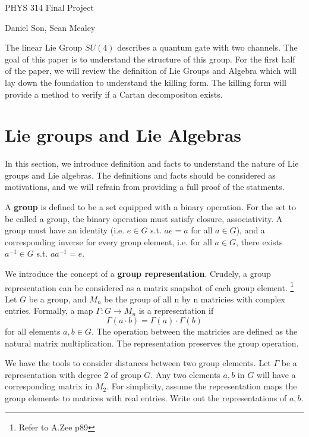 \documentclass{article}
\begin{document}
\begin{center}
\LARGE
PHYS 314 Final Project

\Large
Daniel Son, Sean Mealey
\end{center}

\normalsize

The linear Lie Group $SU(4)$ describes a quantum gate with two channels. 
The goal of this paper is to understand the structure of this group. 
For the first half of the paper, we will review the definition of Lie Groups 
and Algebra which will lay down the foundation to understand the killing form. 
The killing form will provide a method to verify if a Cartan decompositon 
exists. 

\section{Lie groups and Lie Algebras}


In this section, we introduce definition and facts to 
understand the nature of Lie groups and Lie algebras. 
The definitions and facts should be considered as motivations, 
and we will refrain from providing a full proof of the statments. 


A \textbf{group} is defined to be a set equipped with a binary operation. 
For the set to be called a group, the binary operation must satisfy 
closure, associativity. A group must have an identity (i.e. $e \in G$ s.t. 
$a e = a$ for all $a \in G$), and a corresponding 
inverse for every group element, i.e. for all $a \in G$, there exists $a^{-1} \in G$ s.t. 
$a a^{-1} = e$. 

We introduce the concept of a \textbf{group representation}. 
Crudely, a group representation can be considered as a matrix snapshot 
of each group element. \footnote{Refer to A.Zee p89}
Let $G$ be a group, and $M_n$ be the group of all n by n matricies 
with complex entries. 
Formally, a map $\Gamma: G \rightarrow M_n$ is a representation if 
\[
    \Gamma(a \cdot b) = \Gamma(a) \cdot \Gamma(b)
\]
for all elements $a, b \in G$. The operation between the matricies 
are defined as the natural matrix multiplication. The representation 
preserves the group operation. 

We have the tools to consider distances between two group elements. 
Let $\Gamma$ be a representation with degree 2 of group $G$. Any two elements 
$a, b$ in $G$ will have a corresponding matrix in $M_2$.
For simplicity, assume the representation maps the group 
elements to matrices with real entries. 
Write out 
the representations of $a, b$. 
\end{document}
